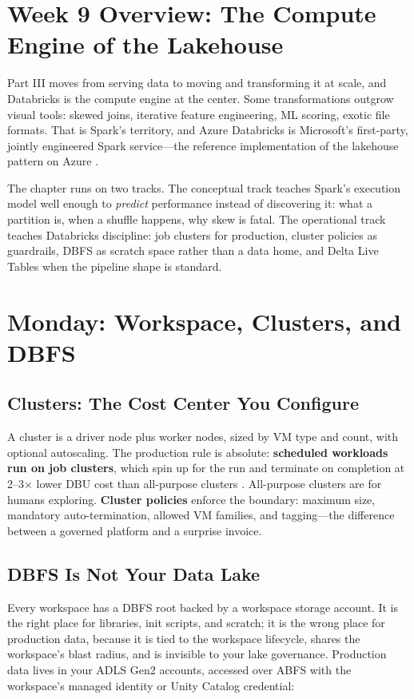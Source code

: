 \section{Week 9 Overview: The Compute Engine of the Lakehouse}
Part III moves from serving data to moving and transforming it at scale, and Databricks is the compute engine at the center. Some transformations outgrow visual tools: skewed joins, iterative feature engineering, ML scoring, exotic file formats. That is Spark's territory, and Azure Databricks is Microsoft's first-party, jointly engineered Spark service---the reference implementation of the lakehouse pattern on Azure \cite{microsoft2025databricks}.

The chapter runs on two tracks. The conceptual track teaches Spark's execution model well enough to \emph{predict} performance instead of discovering it: what a partition is, when a shuffle happens, why skew is fatal. The operational track teaches Databricks discipline: job clusters for production, cluster policies as guardrails, DBFS as scratch space rather than a data home, and Delta Live Tables when the pipeline shape is standard.

\section{Monday: Workspace, Clusters, and DBFS}

\subsection{Clusters: The Cost Center You Configure}
A cluster is a driver node plus worker nodes, sized by VM type and count, with optional autoscaling. The production rule is absolute: \textbf{scheduled workloads run on job clusters}, which spin up for the run and terminate on completion at 2--3$\times$ lower DBU cost than all-purpose clusters \cite{microsoft2025databricks}. All-purpose clusters are for humans exploring. \textbf{Cluster policies} enforce the boundary: maximum size, mandatory auto-termination, allowed VM families, and tagging---the difference between a governed platform and a surprise invoice.

\subsection{DBFS Is Not Your Data Lake}
Every workspace has a DBFS root backed by a workspace storage account. It is the right place for libraries, init scripts, and scratch; it is the wrong place for production data, because it is tied to the workspace lifecycle, shares the workspace's blast radius, and is invisible to your lake governance. Production data lives in your ADLS Gen2 accounts, accessed over ABFS with the workspace's managed identity or Unity Catalog credential:

